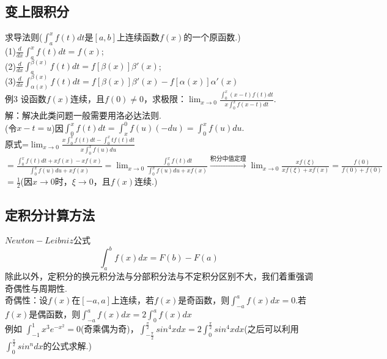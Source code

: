 \documentclass[UTF8]{ctexart}
\begin{document}
\vspace{-4mm} \subsection{变上限积分} \vspace{-2mm} 求导法则($\displaystyle{\int_a^x f(t)dt }$是$[a,b]$上连续函数$f(x)$的一个原函数.)
\\ (1)$\displaystyle{\frac{d}{dx} \int _a^x f(t)dt=f(x)}$;
\\(2)$\displaystyle{\frac{d}{dx}\int_a^{\beta(x)} f(t)dt=f[\beta(x)]\beta'(x) }$;
\\ (3)$\displaystyle{\frac{d}{dx}\int_{\alpha(x)}^{\beta(x)} f(t)dt=f[\beta(x)]\beta'(x)-f[\alpha(x)]\alpha'(x)} $
\\ 例3 设函数$f(x)$连续，且$f(0)\neq 0$，求极限：$\displaystyle{\lim_{x \to 0} \frac{\int _0^x (x-t)f(t)dt}{x\int_0^x f(x-t)dt}.}$
\\解：解决此类问题一般需要用洛必达法则.
\\(令$x-t=u$)因$\displaystyle{\int_0^x f(t)dt=\int_x^0 f(u)(-du)=\int_0^x f(u)du.}$
\\原式=$\displaystyle{\lim_{x \to 0} \frac{x\int_0^xf(t)dt-\int_0^xtf(t)dt}{x\int_0^xf(u)du}}$
\\$=\displaystyle{\frac{\int_0^x f(t)dt+xf(x)-xf(x)}{\int_0^x f(u)du+xf(x)}=\lim_{x \to 0} \frac{\int_0^x f(t)dt}{\int _0^x f(u)du+xf(x)}\xrightarrow{\mbox{积分中值定理}}\lim_{x \to 0}\frac{xf(\xi)}{xf(\xi)+xf(x)}=\frac{f(0)}{f(0)+f(0)}}$
\\$\displaystyle{=\frac{1}{2}}$(因$x\rightarrow 0$时，$\xi\rightarrow 0$，且$f(x)$连续.)
\vspace{-4mm} \subsection{定积分计算方法} \vspace{-2mm} $Newton-Leibniz$公式
\\$$\displaystyle{\int_a^b f(x)dx=F(b)-F(a)} $$
除此以外，定积分的换元积分法与分部积分法与不定积分区别不大，我们着重强调奇偶性与周期性.
\\ 奇偶性：设$f(x)$在$[-a,a]$上连续，若$f(x)$是奇函数，则$\displaystyle{\int_{-a}^a f(x)dx=0} $.若$f(x)$是偶函数，则$\displaystyle{\int_{-a}^a f(x)dx=2\int_0^a f(x)dx} $
\\ 例如 $\displaystyle{\int_{-1}^1 x^3e^{-x^2}=0 }$(奇乘偶为奇)，$\displaystyle{\int_{-\frac{\pi}{2}}^{\frac{\pi}{2}} sin^4x dx=2\int _0^\frac{\pi}{2} sin^4xdx}$(之后可以利用$\displaystyle{\int _0^\frac{\pi}{2} sin^ndx}$的公式求解.)
\end{document}
